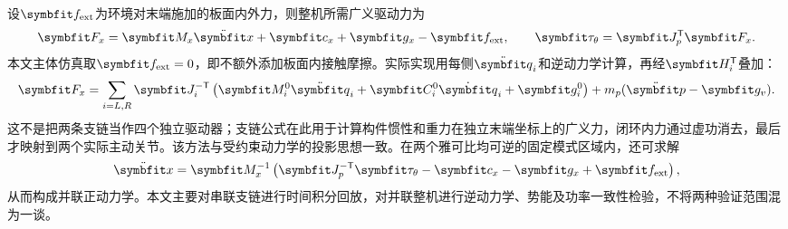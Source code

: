 设$\vect f_{\mathrm{ext}}$为环境对末端施加的板面内外力，则整机所需广义驱动力为
\begin{equation}
\vect F_x=\vect M_x\ddot{\vect x}+\vect c_x+\vect g_x-\vect f_{\mathrm{ext}},\qquad
\vect\tau_\theta=\vect J_p^\T\vect F_x.
\label{eq:parallel_dyn}
\end{equation}
本文主体仿真取$\vect f_{\mathrm{ext}}=0$，即不额外添加板面内接触摩擦。实际实现用每侧$\ddot{\vect q}_i$和逆动力学计算，再经$\vect H_i^\T$叠加：
\begin{equation}
\vect F_x=\sum_{i=L,R}\vect J_i^{-\T}
\left(\vect M_i^0\ddot{\vect q}_i+\vect C_i^0\dot{\vect q}_i+\vect g_i^0\right)
+m_p(\ddot{\vect p}-\vect g_v).
\label{eq:assembled}
\end{equation}
这不是把两条支链当作四个独立驱动器；支链公式在此用于计算构件惯性和重力在独立末端坐标上的广义力，闭环内力通过虚功消去，最后才映射到两个实际主动关节。该方法与受约束动力学的投影思想一致\cite{lynch2017}。在两个雅可比均可逆的固定模式区域内，还可求解
\begin{equation}
\ddot{\vect x}=\vect M_x^{-1}\left(\vect J_p^{-\T}\vect\tau_\theta-\vect c_x-\vect g_x+\vect f_{\mathrm{ext}}\right),
\end{equation}
从而构成并联正动力学。本文主要对串联支链进行时间积分回放，对并联整机进行逆动力学、势能及功率一致性检验，不将两种验证范围混为一谈。
